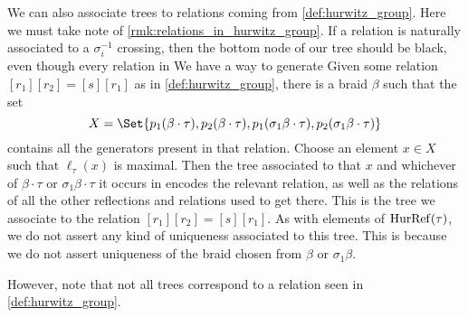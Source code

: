 We can also associate trees to relations coming from \cref{def:hurwitz_group}.
Here we must take note of \cref{rmk:relations_in_hurwitz_group}.
If a relation is naturally associated to a $\sigma_i^{-1}$ crossing, then the bottom node of our tree should be black, even though every relation in
We have a way to generate Given some relation $[r_1][r_2] = [s][r_1]$ as in \cref{def:hurwitz_group}, there is a braid $\beta$ such that the set
\[
	X = \Set{p_1(\beta \cdot \tau), p_2(\beta \cdot \tau), p_1(\sigma_1\beta\cdot \tau), p_2(\sigma_1\beta\cdot\tau)}
\]
contains all the generators present in that relation.
Choose an element $x \in X$ such that $\ell_\tau(x)$ is maximal.
Then the tree associated to that $x$ and whichever of $\beta\cdot \tau$ or $\sigma_1\beta\cdot\tau$ it occurs in encodes the relevant relation, as well as the relations of all the other reflections and relations used to get there.
This is the tree we associate to the relation $[r_1][r_2] = [s][r_1]$.
As with elements of $\operatorname{HurRef}(\tau)$, we do not assert any kind of uniqueness associated to this tree.
This is because we do not assert uniqueness of the  braid chosen from $\beta$ or $\sigma_1\beta$.

However, note that not all trees correspond to a relation seen in \cref{def:hurwitz_group}.

